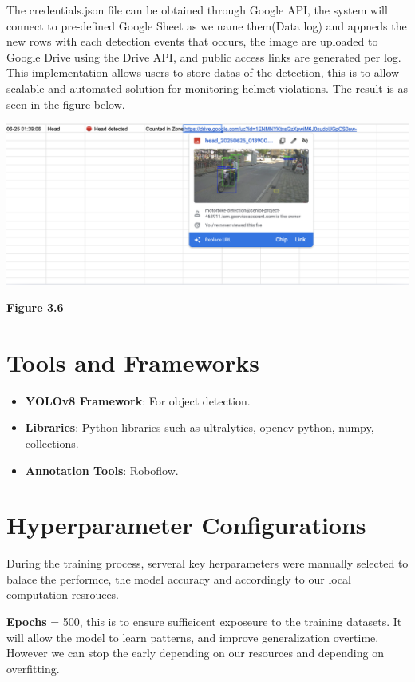 \noindent\hspace{2.5em}The credentials.json file can be obtained through Google API, the system will connect to pre-defined Google Sheet as we name them(Data log) and appneds the new rows with each detection events that occurs, the image are uploaded to Google Drive using the Drive API, and public access links are generated per log. This implementation allows users to store datas of the detection, this is to allow scalable and automated solution for monitoring helmet violations. The result is as seen in the figure below.

\begin{center}
	\includegraphics[width=1\textwidth]{api.png}
	
	\vspace{0.5em}
	\textbf{Figure 3.6}
\end{center}

\section{Tools and Frameworks}
\begin{itemize}
	\item \textbf{YOLOv8 Framework}: For object detection.
	\item \textbf{Libraries}: Python libraries such as ultralytics, opencv-python, numpy, collections.
	\item \textbf{Annotation Tools}: Roboflow.
	
\end{itemize}


\section{Hyperparameter Configurations}
During the training process, serveral key herparameters were manually selected to balace the performce, the model accuracy and accordingly to our local computation resrouces.

\textbf{Epochs} = 500, this is to ensure suffieicent exposeure to the training datasets. It will allow the model to learn patterns, and improve generalization overtime. However we can stop the early depending on our resources and depending on overfitting.

